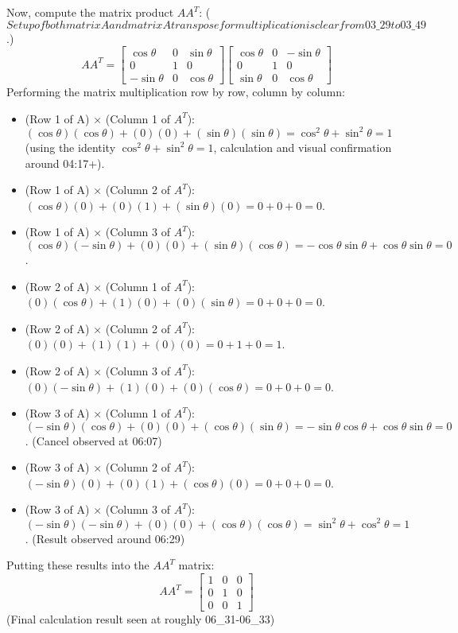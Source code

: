 \documentclass{article}
\begin{document}
Now, compute the matrix product $A A^T$:
($ Setup of both matrix A and matrix A transpose for multiplication is clear from 03\_29 to 03\_49 $.)
\[ A A^T = \begin{bmatrix} \cos \theta & 0 & \sin \theta \\ 0 & 1 & 0 \\ -\sin \theta & 0 & \cos \theta \end{bmatrix} \begin{bmatrix} \cos \theta & 0 & -\sin \theta \\ 0 & 1 & 0 \\ \sin \theta & 0 & \cos \theta \end{bmatrix} \]
Performing the matrix multiplication row by row, column by column:
\begin{itemize}
    \item (Row 1 of A) $\times$ (Column 1 of $A^T$): $(\cos \theta)(\cos \theta) + (0)(0) + (\sin \theta)(\sin \theta) = \cos^2 \theta + \sin^2 \theta = 1$ (using the identity $\cos^2 \theta + \sin^2 \theta = 1$, calculation and visual confirmation around 04:17+).
    \item (Row 1 of A) $\times$ (Column 2 of $A^T$): $(\cos \theta)(0) + (0)(1) + (\sin \theta)(0) = 0 + 0 + 0 = 0$.
    \item (Row 1 of A) $\times$ (Column 3 of $A^T$): $(\cos \theta)(-\sin \theta) + (0)(0) + (\sin \theta)(\cos \theta) = -\cos\theta\sin\theta + \cos\theta\sin\theta = 0$.

    \item (Row 2 of A) $\times$ (Column 1 of $A^T$): $(0)(\cos \theta) + (1)(0) + (0)(\sin \theta) = 0 + 0 + 0 = 0$.
    \item (Row 2 of A) $\times$ (Column 2 of $A^T$): $(0)(0) + (1)(1) + (0)(0) = 0 + 1 + 0 = 1$.
    \item (Row 2 of A) $\times$ (Column 3 of $A^T$): $(0)(-\sin \theta) + (1)(0) + (0)(\cos \theta) = 0 + 0 + 0 = 0$.

    \item (Row 3 of A) $\times$ (Column 1 of $A^T$): $(-\sin \theta)(\cos \theta) + (0)(0) + (\cos \theta)(\sin \theta) = -\sin\theta\cos\theta + \cos\theta\sin\theta = 0$. (Cancel observed at 06:07)
    \item (Row 3 of A) $\times$ (Column 2 of $A^T$): $(-\sin \theta)(0) + (0)(1) + (\cos \theta)(0) = 0 + 0 + 0 = 0$.
    \item (Row 3 of A) $\times$ (Column 3 of $A^T$): $(-\sin \theta)(-\sin \theta) + (0)(0) + (\cos \theta)(\cos \theta) = \sin^2 \theta + \cos^2 \theta = 1$. (Result observed around 06:29)
\end{itemize}
Putting these results into the $A A^T$ matrix:
\[ A A^T = \begin{bmatrix} 1 & 0 & 0 \\ 0 & 1 & 0 \\ 0 & 0 & 1 \end{bmatrix} \]
(Final calculation result seen at roughly 06\_31-06\_33)
\end{document}
